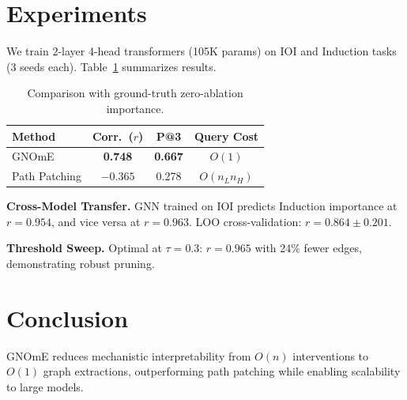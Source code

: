 \documentclass[conference]{IEEEtran}
\begin{document}
\section{Experiments}

We train 2-layer 4-head transformers (105K params) on IOI and Induction tasks (3 seeds each). Table~\ref{tab:results} summarizes results.

\begin{table}[t]
\centering
\caption{Comparison with ground-truth zero-ablation importance.}
\label{tab:results}
\begin{tabular}{lccc}
\toprule
Method & Corr.\ ($r$) & P@3 & Query Cost \\
\midrule
GNOmE & \textbf{0.748} & \textbf{0.667} & $O(1)$ \\
Path Patching & $-0.365$ & 0.278 & $O(n_L n_H)$ \\
\bottomrule
\end{tabular}
\end{table}

\textbf{Cross-Model Transfer.} GNN trained on IOI predicts Induction importance at $r = 0.954$, and vice versa at $r = 0.963$. LOO cross-validation: $r = 0.864 \pm 0.201$.

\textbf{Threshold Sweep.} Optimal at $\tau = 0.3$: $r = 0.965$ with 24\% fewer edges, demonstrating robust pruning.

\section{Conclusion}

GNOmE reduces mechanistic interpretability from $O(n)$ interventions to $O(1)$ graph extractions, outperforming path patching while enabling scalability to large models.



\end{document}
